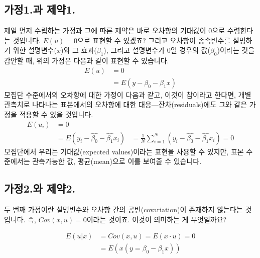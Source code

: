 \documentclass[
]{book}
\begin{document}
\hypertarget{uxac00uxc8151.uxacfc-uxc81cuxc57d1.}{%
\subsection{가정1.과 제약1.}\label{uxac00uxc8151.uxacfc-uxc81cuxc57d1.}}

제일 먼저 수립하는 가정과 그에 따른 제약은 바로 오차항의 기대값이 0으로 수렴한다는 것입니다. \(E(u) = 0\)으로 표현할 수 있겠죠? 그리고 오차항이 종속변수를 설명하기 위한 설명변수(\(x\))와 그 효과(\(\beta_1\)), 그리고 설명변수가 0일 경우의 값(\(\beta_0\))이라는 것을 감안할 때, 위의 가정은 다음과 같이 표현할 수 있습니다.
\begin{equation*}
\begin{aligned}
E(u)&= 0\\
&= E(y-\beta_0-\beta_1x)
\end{aligned}
\end{equation*}
모집단 수준에서의 오차항에 대한 가정이 다음과 같고, 이것이 참이라고 한다면, 개별 관측치로 나타나는 표본에서의 오차항에 대한 대응---잔차(residuals)에도 그와 같은 가정을 적용할 수 있을 것입니다.
\begin{equation*}
\begin{aligned}
E(u_i)&= 0\\
&= E(y_i-\hat{\beta_0}-\hat{\beta_1}x_i)
&= \frac{1}{N}\sum^{N}_{i=1}(y_i-\hat{\beta_0}-\hat{\beta_1}x_i) = 0
\end{aligned}
\end{equation*}
모집단에서 우리는 기대값(expected values)이라는 표현을 사용할 수 있지만, 표본 수준에서는 관측가능한 값, 평균(mean)으로 이를 보여줄 수 있습니다.

\hypertarget{uxac00uxc8152.uxc640-uxc81cuxc57d2.}{%
\subsection{가정2.와 제약2.}\label{uxac00uxc8152.uxc640-uxc81cuxc57d2.}}

두 번째 가정이란 설명변수와 오차항 간의 공변(covariation)이 존재하지 않는다는 것입니다. 즉, \(Cov(x, u)=0\)이라는 것이죠. 이것이 의미하는 게 무엇일까요?

\begin{equation*}
\begin{aligned}
E(u|x)&= Cov(x, u) = E(x\cdot u)=0\\
&=E(x(y=\beta_0-\beta_1x))
\end{aligned}
\end{equation*}
\end{document}
